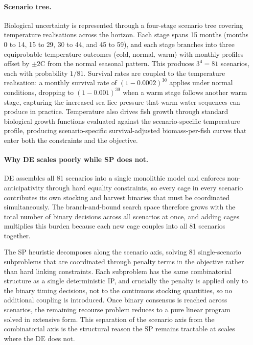 \documentclass[12pt,a4paper]{article}
\begin{document}
\paragraph{Scenario tree.}
Biological uncertainty is represented through a four-stage scenario tree
covering temperature realisations across the horizon. Each stage spans 15
months (months 0 to 14, 15 to 29, 30 to 44, and 45 to 59), and each stage
branches into three equiprobable temperature outcomes (cold, normal,
warm) with monthly profiles offset by $\pm 2$\textdegree C from the
normal seasonal pattern. This produces $3^4 = 81$ scenarios, each with
probability $1/81$. Survival rates are coupled to the temperature
realisation: a monthly survival rate of $(1 - 0.0002)^{30}$ applies under
normal conditions, dropping to $(1 - 0.001)^{30}$ when a warm stage
follows another warm stage, capturing the increased sea lice pressure
that warm-water sequences can produce in practice. Temperature also
drives fish growth through standard biological growth functions
evaluated against the scenario-specific temperature profile, producing
scenario-specific survival-adjusted biomass-per-fish curves that enter
both the constraints and the objective.

\paragraph{Why DE scales poorly while SP does not.}
DE assembles all 81 scenarios into a single monolithic model and enforces
non-anticipativity through hard equality constraints, so every cage in every
scenario contributes its own stocking and harvest binaries that must be
coordinated simultaneously. The branch-and-bound search space therefore grows
with the total number of binary decisions across all scenarios at once, and
adding cages multiplies this burden because each new cage couples into all 81
scenarios together.

The SP heuristic decomposes along the scenario axis, solving 81 single-scenario
subproblems that are coordinated through penalty terms in the objective rather
than hard linking constraints. Each subproblem has the same combinatorial
structure as a single deterministic IP, and crucially the penalty is applied
only to the binary timing decisions, not to the continuous stocking
quantities, so no additional coupling is introduced. Once binary consensus is
reached across scenarios, the remaining recourse problem reduces to a pure
linear program solved in extensive form. This separation of the scenario axis from the combinatorial axis is the
structural reason the SP remains tractable at scales where the DE does not.
\end{document}
